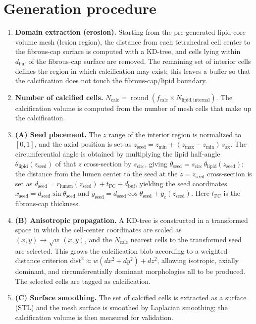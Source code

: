 \documentclass[master,english,final]{kaist-ucs}
\begin{document}
\section{Generation procedure}
\begin{enumerate}
\item \textbf{Domain extraction (erosion).} Starting from the pre-generated lipid-core volume mesh (lesion region), the distance from each tetrahedral cell center to the fibrous-cap surface is computed with a KD-tree, and cells lying within $d_\mathrm{buf}$ of the fibrous-cap surface are removed. The remaining set of interior cells defines the region in which calcification may exist; this leaves a buffer so that the calcification does not touch the fibrous-cap/lipid boundary.
\item \textbf{Number of calcified cells.} $N_\mathrm{calc}=\operatorname{round}(f_\mathrm{calc}\times N_\mathrm{lipid,internal})$. The calcification volume is computed from the number of mesh cells that make up the calcification.
\item \textbf{(A) Seed placement.} The $z$ range of the interior region is normalized to $[0,1]$, and the axial position is set as $z_\mathrm{seed}=z_\mathrm{min}+(z_\mathrm{max}-z_\mathrm{min})\,s_\mathrm{ax}$. The circumferential angle is obtained by multiplying the lipid half-angle $\theta_\mathrm{lipid}(z_\mathrm{seed})$ of that $z$ cross-section by $s_\mathrm{circ}$, giving $\theta_\mathrm{seed}=s_\mathrm{circ}\,\theta_\mathrm{lipid}(z_\mathrm{seed})$; the distance from the lumen center to the seed at the $z=z_\mathrm{seed}$ cross-section is set as $d_\mathrm{seed}=r_\mathrm{lumen}(z_\mathrm{seed})+t_\mathrm{FC}+d_\mathrm{buf}$, yielding the seed coordinates $x_\mathrm{seed}=d_\mathrm{seed}\sin\theta_\mathrm{seed}$ and $y_\mathrm{seed}=d_\mathrm{seed}\cos\theta_\mathrm{seed}+y_c(z_\mathrm{seed})$. Here $t_\mathrm{FC}$ is the fibrous-cap thickness.
\item \textbf{(B) Anisotropic propagation.} A KD-tree is constructed in a transformed space in which the cell-center coordinates are scaled as $(x,y)\!\to\!\sqrt{w}\,(x,y)$, and the $N_\mathrm{calc}$ nearest cells to the transformed seed are selected. This grows the calcification blob according to a weighted distance criterion $\mathrm{dist}^2 \approx w(dx^2+dy^2)+dz^2$, allowing isotropic, axially dominant, and circumferentially dominant morphologies all to be produced. The selected cells are tagged as calcification.
\item \textbf{(C) Surface smoothing.} The set of calcified cells is extracted as a surface (STL) and the mesh surface is smoothed by Laplacian smoothing; the calcification volume is then measured for validation.
\end{enumerate}
\end{document}
